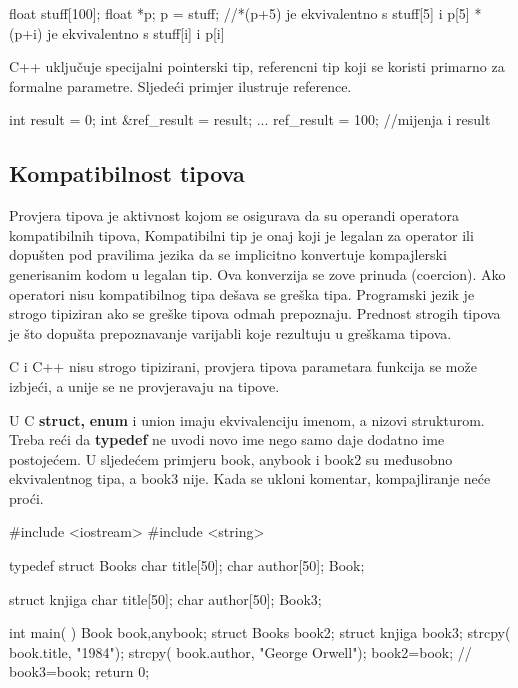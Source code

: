\documentclass[11pt]{book}
\begin{document}
\begin{shortlisting}
  float stuff[100];
  float *p;
  p = stuff;
  //*(p+5) je ekvivalentno s stuff[5] i p[5]
  *(p+i) je ekvivalentno s stuff[i] i p[i]
\end{shortlisting}

C++ uključuje specijalni pointerski tip, referencni tip koji se koristi primarno za formalne parametre. Sljedeći primjer ilustruje reference.

\begin{shortlisting}
  int result = 0;
  int &ref_result = result;
  ...
  ref_result = 100; //mijenja i result
\end{shortlisting}

\subsection{Kompatibilnost tipova}

Provjera tipova je aktivnost kojom se osigurava da su operandi operatora kompatibilnih tipova, Kompatibilni tip je onaj koji je legalan za operator ili dopušten pod pravilima jezika da se implicitno konvertuje kompajlerski generisanim kodom u legalan tip. Ova konverzija se zove prinuda (coercion). Ako operatori nisu kompatibilnog tipa dešava se greška tipa. Programski jezik  je  strogo  tipiziran  ako  se  greške  tipova  odmah  prepoznaju. Prednost  strogih  tipova je što dopušta prepoznavanje varijabli koje rezultuju u greškama tipova.

C i C++ nisu strogo tipizirani, provjera tipova parametara funkcija se može izbjeći, a unije se ne provjeravaju na tipove.

U  C  \textbf{struct,} \textbf{enum}  i  union  imaju  ekvivalenciju  imenom,  a  nizovi strukturom.  Treba  reći  da \textbf{typedef} ne uvodi novo ime nego samo daje dodatno ime postojećem. U sljedećem primjeru book,  anybook  i  book2  su  međusobno  ekvivalentnog  tipa,  a  book3  nije.  Kada  se  ukloni komentar, kompajliranje neće proći.

\begin{shortlisting}
  #include <iostream>
  #include <string>

  typedef struct Books {
      char title[50];
      char author[50];
    } Book;

  struct knjiga {
      char title[50];
      char author[50];
    } Book3;

  int main( ) {  Book book,anybook;
      struct Books book2;
      struct knjiga book3;
      strcpy( book.title, "1984");
      strcpy( book.author, "George Orwell");
      book2=book;
      // book3=book;
      return 0;
    }
\end{shortlisting}
\end{document}
